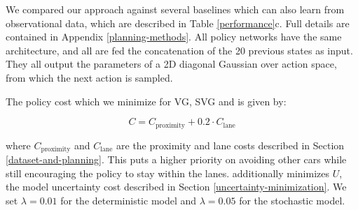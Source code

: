 \documentclass{article} %
\begin{document}
    We compared our approach against several baselines which can also learn from observational data, which are described in Table \ref{performance}c. Full details are contained in Appendix \ref{planning-methods}.
    All policy networks have the same architecture, and all are fed the concatenation of the 20 previous states as input. They all output the parameters of a 2D diagonal Gaussian over action space, from which the next action is sampled.






    The policy cost which we minimize for VG, SVG and \modelnamedrop is given by:

    \begin{equation}
      C = C_{\text{proximity}} + 0.2 \cdot C_\text{lane}
    \end{equation}

    where $C_{\text{proximity}}$ and $C_\text{lane}$ are the proximity and lane costs described in Section \ref{dataset-and-planning}. This puts a higher priority on avoiding other cars while still encouraging the policy to stay within the lanes. \modelnamedrop additionally minimizes $U$, the model uncertainty cost described in Section \ref{uncertainty-minimization}. We set $\lambda=0.01$ for the deterministic model and $\lambda=0.05$ for the stochastic model.
\end{document}

